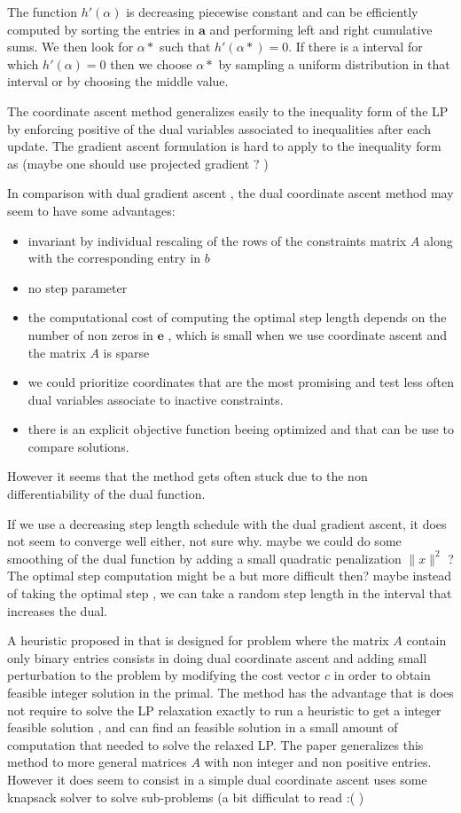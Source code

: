 \documentclass[11pt]{article}
\begin{document}
The function $h'(\alpha)$ is decreasing piecewise constant and can be efficiently computed by sorting the entries in $\mathbf{a}$ and performing left and right cumulative sums.
We then look for $\alpha*$ such that $h'(\alpha*)=0$. If there is a interval for which $h'(\alpha)=0$ then we choose $\alpha*$ by sampling a uniform distribution in that interval or by choosing the middle value.


The coordinate ascent method generalizes easily to the inequality form of the LP by enforcing positive of the dual variables associated to inequalities after each update.
The gradient ascent formulation is hard to apply to the inequality form as (maybe one should use projected gradient ? )

In comparison with dual gradient ascent , the dual coordinate ascent method may seem to have some advantages:
\begin{itemize}
\item invariant by individual rescaling of the rows of the constraints matrix $A$ along with the corresponding entry in $b$
\item no step parameter
\item the computational cost of computing the optimal step length depends on the number of non zeros in $\mathbf{e}$ , which  is small when we use coordinate ascent and the matrix $A$ is sparse
\item we could prioritize coordinates that are the most promising and test less often dual variables associate to inactive  constraints.
\item there is an explicit objective function beeing optimized and that can be use to compare solutions.
\end{itemize}
However it seems that the method  gets often stuck due to the non differentiability of the dual function.


If we use a decreasing step length  schedule with the dual gradient ascent, it does not seem to converge well either, not sure why.
maybe we could do some smoothing of the dual function by adding a small quadratic penalization $\|x\|^2$ ?
The optimal step computation might be a but more difficult then? 
maybe instead of taking the optimal step , we can take a random step length in the interval that increases the dual.

A heuristic proposed in \cite{Wedelin2013,Wedelin1995} that is designed for problem where the matrix $A$ contain only binary entries consists in doing dual coordinate ascent and adding small  perturbation to the problem  by modifying the cost vector $c$ in order to obtain feasible integer solution in the primal.
The method has the advantage that is does not require to solve the LP relaxation exactly to run a heuristic to get a integer feasible solution , and can find an feasible solution in a small amount of computation that needed to solve the relaxed LP. The paper \cite{Bastert2010} generalizes this method to more general matrices $A$ with non integer and non positive entries.
However it does seem to consist in a simple dual coordinate ascent uses some knapsack solver to solve sub-problems (a bit difficulat to read :( )
\end{document}

